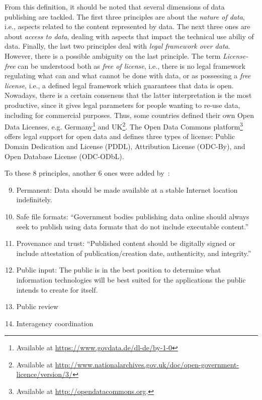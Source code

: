 From this definition, it should be noted that several dimensions of data publishing are tackled.
The first three principles are about the \emph{nature of data}, i.e., aspects related to the content represented by data.
The next three ones are about \emph{access to data}, dealing with aspects that impact the technical use abiliy of data.
Finally, the last two principles deal with \emph{legal framework over data}.
However, there is a possible ambiguity on the last principle.
The term \emph{License-free} can be understood both as \emph{free of license}, i.e., there is no legal framework regulating what can and what cannot be done with data, or as possessing a \emph{free license}, i.e., a defined legal framework which guarantees that data is open. 
Nowadays, there is a certain consensus that the latter interpretation is the most productive, since it gives legal parameters for people wanting to re-use data, including for commercial purposes.
Thus, some countries defined their own Open Data Licenses, e.g. Germany\footnote{Available at \url{https://www.govdata.de/dl-de/by-1-0}} and UK\footnote{Available at \url{http://www.nationalarchives.gov.uk/doc/open-government-licence/version/3/}}.
The Open Data Commons platform\footnote{Available at \url{http://opendatacommons.org}.} offers legal support for open data and defines three types of license: Public Domain Dedication and License (PDDL), Attribution License (ODC-By), and Open Database License (ODC-ODbL).

To these 8 principles, another 6 ones were added by~:

\begin{enumerate} \setcounter{enumi}{8}
	\item Permanent: Data should be made available at a stable Internet location indefinitely.
	\item Safe file formats: “Government bodies publishing data online should always seek to publish using data formats that do not include executable content.”
	\item Provenance and trust: “Published content should be digitally signed or include attestation of publication/creation date, authenticity, and integrity.”
	\item Public input: The public is in the best position to determine what information technologies will be best suited for the applications the public intends to create for itself.
	\item Public review
	\item Interagency coordination
\end{enumerate}

